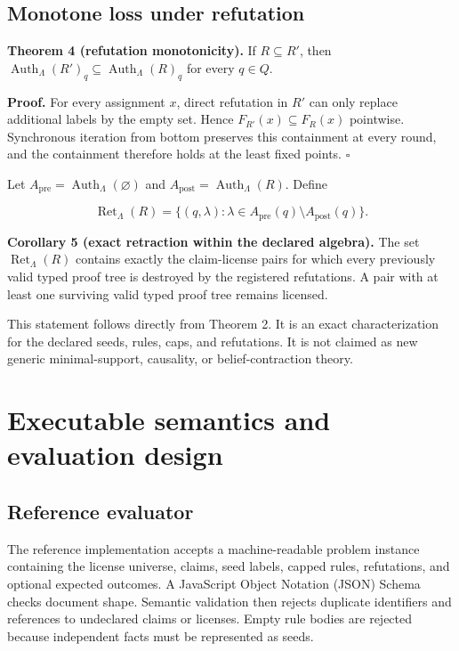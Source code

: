 \documentclass[pdflatex,sn-mathphys-num]{sn-jnl}
\begin{document}
\subsection{Monotone loss under refutation}\label{monotone-loss-under-refutation}

\textbf{Theorem 4 (refutation monotonicity).} If \(R\subseteq R'\), then \(\operatorname{Auth}_\Lambda(R')_q\subseteq\operatorname{Auth}_\Lambda(R)_q\) for every \(q\in Q\).

\textbf{Proof.} For every assignment \(x\), direct refutation in \(R'\) can only replace additional labels by the empty set. Hence \(F_{R'}(x)\subseteq F_R(x)\) pointwise. Synchronous iteration from bottom preserves this containment at every round, and the containment therefore holds at the least fixed points. \(\square\)

Let \(A_{\mathrm{pre}}=\operatorname{Auth}_\Lambda(\varnothing)\) and \(A_{\mathrm{post}}=\operatorname{Auth}_\Lambda(R)\). Define

\[
\operatorname{Ret}_\Lambda(R)=
\{(q,\lambda):\lambda\in A_{\mathrm{pre}}(q)\setminus A_{\mathrm{post}}(q)\}.
\]

\textbf{Corollary 5 (exact retraction within the declared algebra).} The set \(\operatorname{Ret}_\Lambda(R)\) contains exactly the claim-license pairs for which every previously valid typed proof tree is destroyed by the registered refutations. A pair with at least one surviving valid typed proof tree remains licensed.

This statement follows directly from Theorem 2. It is an exact characterization for the declared seeds, rules, caps, and refutations. It is not claimed as new generic minimal-support, causality, or belief-contraction theory.

\section{Executable semantics and evaluation design}\label{executable-semantics-and-evaluation-design}

\subsection{Reference evaluator}\label{reference-evaluator}

The reference implementation accepts a machine-readable problem instance containing the license universe, claims, seed labels, capped rules, refutations, and optional expected outcomes. A JavaScript Object Notation (JSON) Schema checks document shape. Semantic validation then rejects duplicate identifiers and references to undeclared claims or licenses. Empty rule bodies are rejected because independent facts must be represented as seeds.
\end{document}
